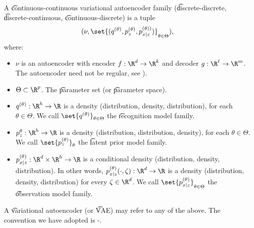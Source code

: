 A \t{continuous-continuous variational autoencoder family} (\t{discrete-discrete}, \t{discrete-continuous}, \t{continuous-discrete}) is a tuple
\[
  (\nu, \set{(q^{(\theta)}, p_z^{(\theta)}, p_{x \mid z}^{(\theta))})}_{\theta \in \Theta}),
\]
where:
\begin{itemize}

  \item
    $\nu$ is an autoencoder with encoder $f: \R^d \to \R^k$ and decoder $g: \R^\ell \to \R^m$.
    The autoencoder need not be regular, see ).

  \item
    $\Theta \subset \R^p$.
    The \t{parameter set} (or \t{parameter space}).

  \item
    $q^{(\theta)}: \R^h \to \R$ is a density (distribution, density, distribution), for each $\theta \in \Theta$.
    We call $\set{q^{(\theta)}}_{\theta \in \Theta}$ the \t{recognition model family}.

  \item
    $p_{z}^{\theta}: \R^h \to \R$ is a density (distribution, distribution, density), for each $\theta \in \Theta$.
    We call $\set{p_{z}^{(\theta)}}_{\theta}$ the \t{latent prior model family}.

  \item
    $p_{x \mid z}^{(\theta)}: \R^d \times \R^h \to \R$ is a conditional density (distribution, density, distribution).
    In other words,  $p_{x \mid z}^{(\theta)}(\cdot, \zeta): \R^d \to \R$ is a density (distribution, density, distribution) for every $\zeta \in \R^d$.
    We call $\set{p_{x \mid z}^{(\theta)}}_{\theta \in \Theta}$ the \t{observation model family}.
\end{itemize}

A \t{variational autoencoder} (or \t{VAE}) may refer to any of the above.
The convention we have adopted is -.

\blankpage
